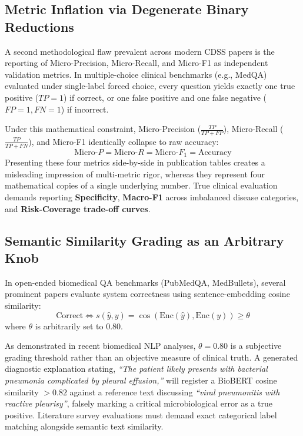 \documentclass[conference]{IEEEtran}
\begin{document}
\subsection{Metric Inflation via Degenerate Binary Reductions}
A second methodological flaw prevalent across modern CDSS papers is the reporting of Micro-Precision, Micro-Recall, and Micro-F1 as independent validation metrics. In multiple-choice clinical benchmarks (e.g., MedQA) evaluated under single-label forced choice, every question yields exactly one true positive ($TP=1$) if correct, or one false positive and one false negative ($FP=1, FN=1$) if incorrect.

Under this mathematical constraint, Micro-Precision ($\frac{TP}{TP+FP}$), Micro-Recall ($\frac{TP}{TP+FN}$), and Micro-F1 identically collapse to raw accuracy:
\begin{equation}
\text{Micro-}P = \text{Micro-}R = \text{Micro-}F_1 = \text{Accuracy}
\end{equation}
Presenting these four metrics side-by-side in publication tables creates a misleading impression of multi-metric rigor, whereas they represent four mathematical copies of a single underlying number. True clinical evaluation demands reporting \textbf{Specificity}, \textbf{Macro-F1} across imbalanced disease categories, and \textbf{Risk-Coverage trade-off curves}.

\subsection{Semantic Similarity Grading as an Arbitrary Knob}
In open-ended biomedical QA benchmarks (PubMedQA, MedBullets), several prominent papers evaluate system correctness using sentence-embedding cosine similarity:
\begin{equation}
\text{Correct} \iff s(\hat{y}, y) = \cos(\text{Enc}(\hat{y}), \text{Enc}(y)) \ge \theta
\end{equation}
where $\theta$ is arbitrarily set to $0.80$. 

As demonstrated in recent biomedical NLP analyses, $\theta = 0.80$ is a subjective grading threshold rather than an objective measure of clinical truth. A generated diagnostic explanation stating, \textit{``The patient likely presents with bacterial pneumonia complicated by pleural effusion,''} will register a BioBERT cosine similarity $>0.82$ against a reference text discussing \textit{``viral pneumonitis with reactive pleurisy''}, falsely marking a critical microbiological error as a true positive. Literature survey evaluations must demand exact categorical label matching alongside semantic text similarity.
\end{document}
